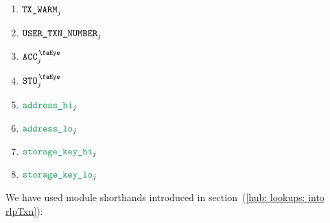 \begin{description}
\begin{multicols}{2}
			\begin{enumerate}
				\item $\texttt{TX}\texttt{\_WARM}                _{j}$
				\item $\texttt{USER}\texttt{\_}\texttt{TXN\_NUMBER} _{j}$
				\item $\peekAccount           _{j}$
				\item $\peekStorage           _{j}$
				\item $\locAddressHi          _{j}$
				\item $\locAddressLo          _{j}$
				\item $\locStorageKeyHi       _{j}$
				\item $\locStorageKeyLo       _{j}$
			\end{enumerate}
		\end{multicols}
\end{description}
\saNote{}
We have used \hubMod{} module shorthands introduced
in section~(\ref{hub: lookups: into rlpTxn}):

